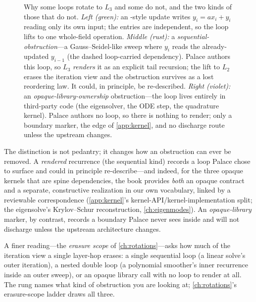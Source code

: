 \begin{figure}[t]
\caption[The two kinds of obstruction]{Why some loops rotate to $L_3$ and some do not,
and the two kinds of those that do not. \emph{Left (green):} an -style
update writes $y_i = a x_i + y_i$ reading only its own input; the entries are
independent, so the loop lifts to one whole-field operation. \emph{Middle (rust):} a
\emph{sequential-obstruction}---a Gauss--Seidel-like sweep where $y_i$ reads the
already-updated $y_{i-1}$ (the dashed loop-carried dependency). Palace authors this
loop, so $L_3$ \emph{renders} it as an explicit tail recursion; the lift to $L_2$
erases the iteration view and the obstruction survives as a lost reordering law. It
could, in principle, be re-described. \emph{Right (violet):} an
\emph{opaque-library-ownership} obstruction---the loop lives entirely in third-party
code (the eigensolver, the ODE step, the quadrature kernel). Palace authors no loop, so
there is nothing to render; only a boundary marker, the  edge of
\cref{app:kernel}, and no discharge route unless the upstream changes.}
\label{fig:obstructionkinds}
\end{figure}

The distinction is not pedantry; it changes how an obstruction can ever be removed. A
\emph{rendered} recurrence (the sequential kind) records a loop Palace chose to
surface and could in principle re-describe---and indeed, for the three opaque kernels
that are spine dependencies, the book provides \emph{both} an opaque
 contract and a separate, constructive realization in our own
vocabulary, linked by a reviewable correspondence (\cref{app:kernel}'s
kernel-API/kernel-implementation split; the eigensolve's Krylov--Schur reconstruction,
\cref{ch:eigenmodes}). An \emph{opaque-library} marker, by contrast, records a boundary
Palace never sees inside and will not discharge unless the upstream architecture
changes.

A finer reading---the \emph{erasure scope} of \cref{ch:rotations}---asks how much of
the iteration view a single layer-hop erases: a single sequential loop (a linear
solve's outer iteration), a nested double loop (a polynomial smoother's inner
recurrence inside an outer sweep), or an opaque library call with no loop to render at
all. The rung names what kind of obstruction you are looking at; \cref{ch:rotations}'s
erasure-scope ladder draws all three.

